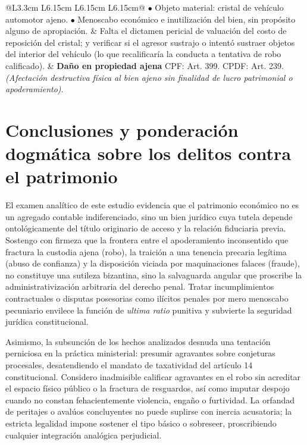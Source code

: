 \documentclass[spanish,letterpaper,oneside]{article}
\begin{document}
\begin{landscape}
\begin{longtable}{@{}L{3.3cm} L{6.15cm} L{6.15cm} L{6.15cm}@{}}
$\bullet$ Objeto material: cristal de veh\'iculo automotor ajeno.\newline
$\bullet$ Menoscabo econ\'omico e inutilizaci\'on del bien, sin prop\'osito alguno de apropiaci\'on. & 
Falta el dictamen pericial de valuaci\'on del costo de reposici\'on del cristal; y verificar si el agresor sustrajo o intent\'o sustraer objetos del interior del veh\'iculo (lo que recalificar\'ia la conducta a tentativa de robo calificado). & 
\textbf{Da\~no en propiedad ajena}\newline
CPF: Art. 399.\newline
CPDF: Art. 239.\newline
\emph{(Afectaci\'on destructiva f\'isica al bien ajeno sin finalidad de lucro patrimonial o apoderamiento)}. \\
\bottomrule
\end{longtable}
\endgroup
\end{landscape}
\clearpage
\pagestyle{fancy}

\clearpage
\section[Conclusiones]{Conclusiones y ponderaci\'on dogm\'atica sobre los delitos contra el patrimonio}

El examen anal\'itico de este estudio evidencia que el patrimonio econ\'omico no es un agregado contable indiferenciado, sino un bien jur\'idico cuya tutela depende ontol\'ogicamente del t\'itulo originario de acceso y la relaci\'on fiduciaria previa. Sostengo con firmeza que la frontera entre el apoderamiento inconsentido que fractura la custodia ajena (robo), la traici\'on a una tenencia precaria leg\'itima (abuso de confianza) y la disposici\'on viciada por maquinaciones falaces (fraude), no constituye una sutileza bizantina, sino la salvaguarda angular que proscribe la administrativizaci\'on arbitraria del derecho penal. Tratar incumplimientos contractuales o disputas posesorias como il\'icitos penales por mero menoscabo pecuniario envilece la funci\'on de \emph{ultima ratio} punitiva y subvierte la seguridad jur\'idica constitucional.

Asimismo, la subsunci\'on de los hechos analizados desnuda una tentaci\'on perniciosa en la pr\'actica ministerial: presumir agravantes sobre conjeturas procesales, desatendiendo el mandato de taxatividad del art\'iculo 14 constitucional. Considero inadmisible calificar agravantes en el robo sin acreditar el espacio f\'isico p\'ublico o la fractura de resguardos, as\'i como imputar despojo cuando no constan fehacientemente violencia, enga\~no o furtividad. La orfandad de peritajes o aval\'uos concluyentes no puede suplirse con inercia acusatoria; la estricta legalidad impone sostener el tipo b\'asico o sobreseer, proscribiendo cualquier integraci\'on anal\'ogica perjudicial.
\end{document}
